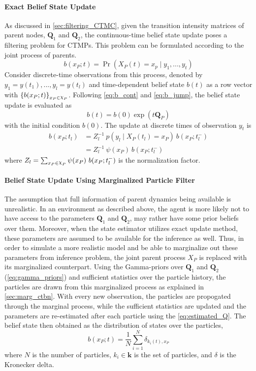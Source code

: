 \paragraph*{Exact Belief State Update}
\label{par:bs_exact}
As discussed in \cref{sec:filtering_CTMC}, given the transition intensity matrices of parent nodes, $ \textbf{Q}_1 $ and $ \textbf{Q}_2 $, the continuous-time belief state update poses a filtering problem for CTMPs. This problem can be formulated according to the joint process of parents.
\begin{equation}
b(x_P; t) = \operatorname{Pr}( X_P(t) = x_{p} \mid y_{1}, ..., y_{t})
\end{equation}
Consider discrete-time observations from this process, denoted by $ y_{1}=y(t_{1}), ..., y_{l}=y(t_{l}) $ and time-dependent belief state $ b(t) $ as a row vector with $ \left\lbrace b(x_P;t)\right\rbrace_{x_P \in \rchi_P} $. Following \autoref{eq:b_cont} and \autoref{eq:b_jump}, the belief state update is evaluated as
\begin{equation}
b(t) = b(0) \exp(t\textbf{Q}_P)
\end{equation}
with the initial condition $ b(0) $.
The update at discrete times of observation $ y_{t} $ is
\begin{align}
b(x_P; t_{l}) &= Z_{l}^{-1}\ {p(y_{l} \mid X_P(t_{l})=x_P)}\ {b(x_P; t_{l}^{-})} \\ & = Z_{l}^{-1}\ \psi(x_P) \ {b(x_P; t_{l}^{-})}
\label{eq:bs_exact}
\end{align}
where $ Z_{l} = \sum_{x_P\in \rchi_P} \psi(x_P)\ b(x_P; t_{l}^{-}) $ is the normalization factor.
\paragraph*{Belief State Update Using Marginalized Particle Filter}
\label{par:bs_partFilt}
The assumption that full information of parent dynamics being available is unrealistic. In an environment as described above, the agent is more likely not to have access to the parameters $ \textbf{Q}_1 $ and $ \textbf{Q}_2 $, may rather have some prior beliefs over them. Moreover, when the state estimator utilizes exact update method, these parameters are assumed to be available for the inference as well. Thus, in order to simulate a more realistic model and be able to marginalize out these parameters from inference problem, the joint parent process $ X_P $ is replaced with its marginalized counterpart. Using the Gamma-priors over $ \textbf{Q}_1 $ and $ \textbf{Q}_2 $ (\autoref{eq:gamma_priors}) and sufficient statistics over the particle history, the particles are drawn from this marginalized process as explained in \cref{sec:marg_ctbn}. With every new observation, the particles are propogated through the marginal process, while the sufficient statistics are updated and the parameters are re-estimated after each particle using the \autoref{eq:estimated_Q}. The belief state then obtained as the distribution of states over the particles,
\begin{equation}
b(x_P; t) = \frac{1}{N} \sum_{i=1}^{N} \delta_{k_i(t), x_P}
\end{equation}
where $ N $ is the number of particles, $ k_i \in \textbf{k} $ is the set of particles, and $\delta$ is the Kronecker delta.


